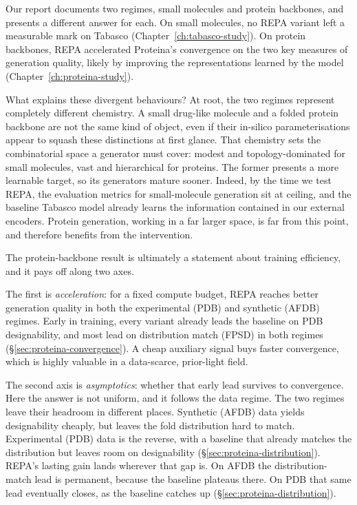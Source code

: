 \documentclass[12pt,a4paper,twoside]{report}
\begin{document}
Our report documents two regimes, small molecules and protein backbones, and presents a different answer for each. On small molecules, no REPA variant left
a measurable mark on Tabasco (Chapter~\ref{ch:tabasco-study}). On protein backbones, REPA accelerated Proteina's convergence on the two key measures of generation quality, likely by improving the representations learned by the model (Chapter~\ref{ch:proteina-study}).

What explains these divergent behaviours? At root, the two regimes represent completely different chemistry. A small drug-like molecule and a folded protein backbone are not the same kind of object, even if their in-silico parameterisations appear to squash these distinctions at first glance. That chemistry sets the combinatorial space a generator must cover: modest and topology-dominated for small molecules, vast and hierarchical for proteins. The former presents a more learnable target, so its generators mature sooner. Indeed, by the time we test REPA, the evaluation metrics for small-molecule generation sit at ceiling, and the baseline Tabasco model already learns the information contained in our external encoders. Protein generation, working in a far larger space, is far from this point, and therefore benefits from the intervention.

The protein-backbone result is ultimately a statement about training efficiency, and it pays off along two axes.

The first is \emph{acceleration}: for a fixed compute budget, REPA reaches better generation quality in both the experimental (PDB) and synthetic (AFDB) regimes. Early in training, every variant already leads the baseline on PDB designability, and most lead on distribution match (FPSD) in both regimes (\S\ref{sec:proteina-convergence}). A cheap auxiliary signal buys faster convergence, which is highly valuable in a data-scarce, prior-light field.

The second axis is \emph{asymptotics}: whether that early lead survives to convergence. Here the answer is not uniform, and it follows the data regime. The two regimes leave their headroom in different places. Synthetic (AFDB) data yields designability cheaply, but leaves the fold distribution hard to match. Experimental (PDB) data is the reverse, with a baseline that already matches the distribution but leaves room on designability (\S\ref{sec:proteina-distribution}). REPA's lasting gain lands wherever that gap is. On AFDB the distribution-match lead is permanent, because the baseline plateaus there. On PDB that same lead eventually closes, as the baseline catches up (\S\ref{sec:proteina-distribution}).
\end{document}

